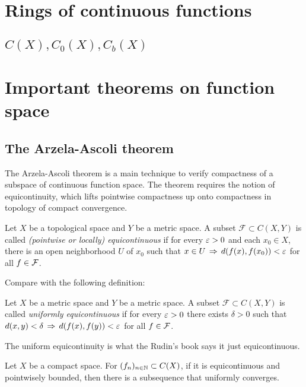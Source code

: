 \documentclass{../crs}
\begin{document}
\section{Rings of continuous functions}



\subsection{$C(X), C_0(X), C_b(X)$}



\section{Important theorems on function space}

\subsection{The Arzela-Ascoli theorem}

The Arzela-Ascoli theorem is a main technique to verify compactness of a subspace of continuous function space.
The theorem requires the notion of equicontinuity, which lifts pointwise compactness up onto compactness in topology of compact convergence.

\begin{defn}
Let $X$ be a topological space and $Y$ be a metric space.
A subset $\mathcal{F}\subset C(X,Y)$ is called \emph{(pointwise or locally) equicontinuous} if for every $\varepsilon>0$ and each $x_0\in X$, there is an open neighborhood $U$ of $x_0$ such that $x\in U\impl d(f(x),f(x_0))<\e$ for all $f\in\mathcal{F}$.
\end{defn}
Compare with the following definition:
\begin{defn}
Let $X$ be a metric space and $Y$ be a metric space.
A subset $\mathcal{F}\subset C(X,Y)$ is called \emph{uniformly equicontinuous} if for every $\varepsilon>0$ there exists $\delta>0$ such that $d(x,y)<\delta\impl d(f(x),f(y))<\e$ for all $f\in\mathcal{F}$.
\end{defn}
The uniform equicontinuity is what the Rudin's book says it just equicontinuous.

\begin{thm}
Let $X$ be a compact space.
For $(f_n)_{n\in\mathbb{N}}\subset C(X)$, if it is equicontinuous and pointwisely bounded, then there is a subsequence that uniformly converges.
\end{thm}
\end{document}
